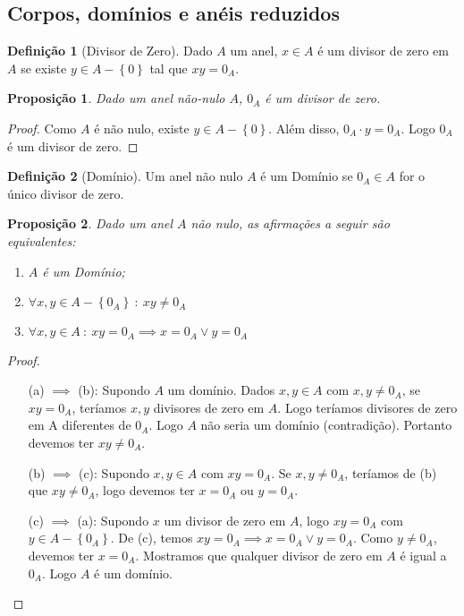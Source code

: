 \documentclass{article}
\newtheorem{prop}{Proposição}[section]
\theoremstyle{theorem}
\theoremstyle{lemma}
\theoremstyle{definition}
\newtheorem{definicao}{Definição}[section]
\theoremstyle{remark}
\begin{document}
\subsection{Corpos, domínios e anéis reduzidos}
\begin{definicao}[Divisor de Zero]
	Dado $A$ um anel, $x\in A$ é um divisor de zero em $A$ se existe $y\in A-\left\{0 \right\}$ tal que $xy = 0_A$.
\end{definicao}
\begin{prop}
	Dado um anel não-nulo $A$, $0_A$ é um divisor de zero.
\end{prop}
\begin{proof}
	Como $A$ é não nulo, existe $y\in A - \left\{0\right\}$. Além disso, $0_A \cdot y = 0_A$. Logo $0_A$ é um divisor de zero.
\end{proof}
\begin{definicao}[Domínio]
	Um anel não nulo $A$ é um Domínio se $0_A \in A$ for o único divisor de zero.
\end{definicao}
\begin{prop}
	Dado um anel $A$ não nulo, as afirmações a seguir são equivalentes:
	\begin{enumerate}[label=(\alph*)]
		\item $A$ é um Domínio;
		\item $\forall x,y \in A - \left\{ 0_A\right\} \: : \: xy \neq 0_A$
		\item $\forall x,y \in A  \: : \: xy = 0_A \implies x = 0_A \lor y = 0_A$
	\end{enumerate}
\end{prop}
\begin{proof}
	\begin{enumerate}[itemindent=36pt]
		\item[(a) $\implies$ (b):] Supondo $A$ um domínio. Dados $x,y\in A$ com $x,y\neq 0_A$,  se $xy = 0_A$, teríamos $x,y$ divisores de zero em $A$. Logo teríamos divisores de zero em A diferentes de $0_A$. Logo $A$ não seria um domínio (contradição). Portanto devemos ter $xy \neq 0_A$.
		\item[(b) $\implies$ (c):] Supondo $x,y\in A$ com $xy = 0_A$. Se $x,y\neq 0_A$, teríamos de (b) que $xy \neq 0_A$, logo devemos ter $x = 0_A$ ou $y = 0_A$.
		\item[(c) $\implies$ (a):] Supondo $x$ um divisor de zero em $A$, logo $xy = 0_A$ com $y\in A-\left\{ 0_A\right\}$. De (c), temos $xy =0_A \implies x = 0_A \lor y = 0_A$. Como $y\neq 0_A$, devemos ter $x = 0_A$. Mostramos que qualquer divisor de zero em $A$ é igual a $0_A$. Logo $A$ é um domínio.
	\end{enumerate}
\end{proof}
\end{document}
